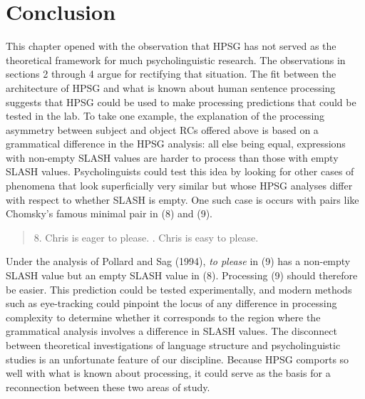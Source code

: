 \documentclass[a4paper]{article}
\begin{document}
\section{Conclusion}

This chapter opened with the observation that HPSG has not served as the theoretical framework for much psycholinguistic research.  The observations in sections 2 through 4 argue for rectifying that situation.  The fit between the architecture of HPSG and what is known about human sentence processing suggests that HPSG could be used to make processing predictions that could be tested in the lab.  
\newline
\newline
To take one example, the explanation of the processing asymmetry between subject and object RCs offered above is based on a grammatical difference in the HPSG analysis:  all else being equal, expressions with non-empty SLASH values are harder to process than those with empty SLASH values.  Psycholinguists could test this idea by looking for other cases of phenomena that look superficially very similar but whose HPSG analyses differ with respect to whether SLASH is empty.  One such case is occurs with pairs like Chomsky's famous minimal pair in (8) and (9).
\begin{quote}
8. Chris is eager to please.
. Chris is easy to please.
\end{quote}
Under the analysis of Pollard and Sag (1994), {\it to please} in (9) has a non-empty SLASH value but an empty SLASH value in (8).  Processing (9) should therefore be easier.  This prediction could be tested experimentally, and modern methods such as eye-tracking could pinpoint the locus of any difference in processing complexity to determine whether it corresponds to the region where the grammatical analysis involves a difference in SLASH values.
\newline
\newline
The disconnect between theoretical investigations of language structure and psycholinguistic studies is an unfortunate feature of our discipline.  Because HPSG comports so well with what is known about processing, it could serve as the basis for a reconnection between these two areas of study.
%
%
%
%
\end{document}
